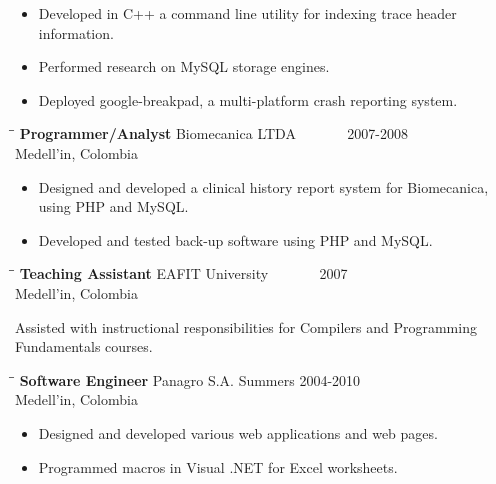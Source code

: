 \documentclass{res}
\begin{document}
\begin{resume}
   \begin{itemize}
       \item Developed in C++ a command line utility for indexing trace header information.
       \item Performed research on MySQL storage engines.
       \item Deployed google-breakpad, a multi-platform crash reporting system.
   \end{itemize}

   
   \begin{tabbing}
   \hspace{2.3in}\= \hspace{2.6in}\= \kill %
    {\bf Programmer/Analyst} \>Biomecanica LTDA\> ~~~~~~ 2007-2008\\
                             \>Medell\a'in, Colombia
   \end{tabbing}\vspace{-5pt}      %

   \begin{itemize}
       \item Designed and developed a clinical history report system for Biomecanica, using PHP and MySQL.
       \item Developed and tested back-up software using PHP and MySQL.
   \end{itemize}

   \begin{tabbing}
   \hspace{2.3in}\= \hspace{2.6in}\= \kill %
    {\bf Teaching Assistant} \>EAFIT University\> ~~~~~~ 2007\\
                          \>Medell\a'in, Colombia
   \end{tabbing}\vspace{-5pt}
    Assisted with instructional responsibilities for Compilers and Programming Fundamentals courses.
   \begin{tabbing}%
   \hspace{2.3in}\= \hspace{2.6in}\= \kill %
   {\bf Software Engineer}\> Panagro S.A.\> Summers  2004-2010\\
                          \>Medell\a'in, Colombia
   \end{tabbing}\vspace{-5pt}
   \begin{itemize}
        \item Designed and developed various web applications and web pages.  
        \item Programmed macros in Visual .NET for Excel worksheets.
   \end{itemize}


\end{resume}
\end{document}
